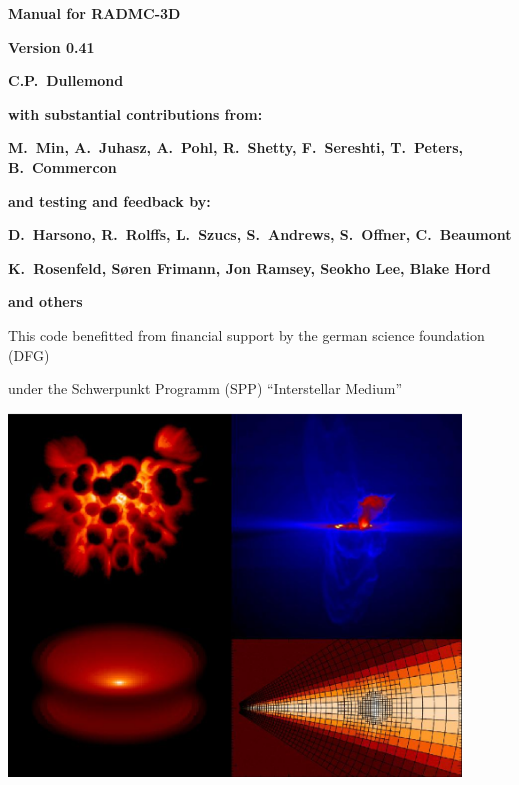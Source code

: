 \documentclass{report}
\begin{document}
\centerline{\Huge \bf Manual for RADMC-3D}

\vspace{1em}

\centerline{\Huge \bf Version 0.41}

\vspace{4em}

\centerline{\huge \bf C.P.~Dullemond}

\vspace{2em}

\centerline{\Large \bf with substantial contributions from:}

\vspace{0.3em}

\centerline{\Large \bf M.~Min, A.~Juhasz, A.~Pohl, R.~Shetty, F.~Sereshti, T.~Peters, B.~Commercon}

\vspace{2em}

\centerline{\Large \bf and testing and feedback by:}

\vspace{0.3em}

\centerline{\Large \bf D.~Harsono, R.~Rolffs, L.~Szucs, S.~Andrews, S.~Offner, C.~Beaumont}
\centerline{\Large \bf K.~Rosenfeld, S\o ren Frimann, Jon Ramsey, Seokho Lee, Blake Hord}
\centerline{\Large \bf and others}

\vspace{2em}

\centerline{\large This code benefitted from financial support by the german
  science foundation (DFG)}
\centerline{\large under the Schwerpunkt Programm (SPP) ``Interstellar
  Medium''}

\vspace{6em}




\centerline{\includegraphics[width=0.9\textwidth]{coverim_lowres.eps}}
\end{document}
